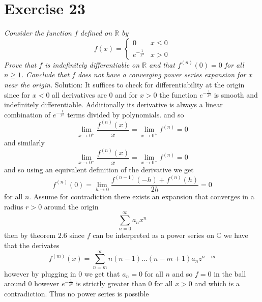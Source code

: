 \documentclass[11pt]{article}
\newcommand{\solution}[1]{{{\textcolor{header}{Solution:} \textcolor{solution}{#1}}}}
\begin{document}
\section{Exercise 23}
\emph{
    Consider the function $f$ defined on $ \mathbb{R}$ by
    \[
    f(x) = 
    \begin{cases}
        0 & x \le 0\\
        e^{-\frac{1}{x^2}} & x >0
    \end{cases}
    \] 
    Prove that $f$ is indefinitely differentiable on $ \mathbb{R}$ and that $f^{(n)}(0) = 0$ for all $n \ge 1$. Conclude
    that  $f$ does not have a converging power series expansion for $x$ near the origin.
}
\solution{
    It suffices to check for differentiability at the origin since for $x < 0$ all derivatives are 0 
    and for  $x > 0$ the function  $e^{-\frac{1}{x^2}}$ is smooth and indefinitely differentiable.
    Additionally its derivative is always a linear combination of $e^{-\frac{1}{x^2}}$ terms divided by polynomials. and so
    \[
    \lim_{x\to 0^{+}}\frac{f^{(n)}(x)}{x} = \lim_{x\to 0^{+}}f^{(n)} = 0
    \] 
    and similarly
    \[
    \lim_{x\to 0^{-}}\frac{f^{(n)}(x)}{x} = \lim_{x\to 0^{-}}f^{(n)} = 0
    \] 
    and so using an equivalent definition of the derivative we get
    \[
    f^{(n)}(0) = \lim_{h\to 0} \frac{f^{(n-1)}(-h) + f^{(n)}(h)}{2h} = 0
    \] 
    for all $n$.
    Assume for contradiction there exists an expansion that converges in a radius $ r >0$ around the origin
     \[
    \sum_{n=0}^{\infty}a_nx^{n}
    \] 
    then by theorem $2.6$ since  $f$ can be interpreted as a power series on $ \mathbb{C}$ we have that the derivates
    \[
    f^{(m)}(x) = \sum_{n=m}^{\infty}n(n-1)\dots(n-m+1)a_nz^{n-m}
    \] 
    however by plugging in $0$ we get that $a_n = 0$ for all  $n$ and so  $f = 0$ in the ball around  $0$ however  $e^{-\frac{1}{x^2}}$ is strictly greater than $0$ for all  $x > 0$ and which is a contradiction. Thus no power series is possible
}
\end{document}
